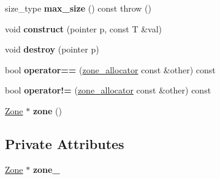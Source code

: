 \begin{DoxyCompactItemize}
\item 
size\+\_\+type {\bfseries max\+\_\+size} () const   throw ()\hypertarget{classv8_1_1internal_1_1zone__allocator_acc053240888a4ee0858b30411dde72d4}{}\label{classv8_1_1internal_1_1zone__allocator_acc053240888a4ee0858b30411dde72d4}

\item 
void {\bfseries construct} (pointer p, const T \&val)\hypertarget{classv8_1_1internal_1_1zone__allocator_a6577687565596d029f37507793c45967}{}\label{classv8_1_1internal_1_1zone__allocator_a6577687565596d029f37507793c45967}

\item 
void {\bfseries destroy} (pointer p)\hypertarget{classv8_1_1internal_1_1zone__allocator_a59a75d1b6c2220221bb73863bf66f56b}{}\label{classv8_1_1internal_1_1zone__allocator_a59a75d1b6c2220221bb73863bf66f56b}

\item 
bool {\bfseries operator==} (\hyperlink{classv8_1_1internal_1_1zone__allocator}{zone\+\_\+allocator} const \&other) const \hypertarget{classv8_1_1internal_1_1zone__allocator_ad47d0343a6939ba85aed7dd97d7326a0}{}\label{classv8_1_1internal_1_1zone__allocator_ad47d0343a6939ba85aed7dd97d7326a0}

\item 
bool {\bfseries operator!=} (\hyperlink{classv8_1_1internal_1_1zone__allocator}{zone\+\_\+allocator} const \&other) const \hypertarget{classv8_1_1internal_1_1zone__allocator_a9547cd20b0acaba1df1d12bef2b77ec5}{}\label{classv8_1_1internal_1_1zone__allocator_a9547cd20b0acaba1df1d12bef2b77ec5}

\item 
\hyperlink{classv8_1_1internal_1_1_zone}{Zone} $\ast$ {\bfseries zone} ()\hypertarget{classv8_1_1internal_1_1zone__allocator_a43a00b3b6f919e207a874ca46bac6a82}{}\label{classv8_1_1internal_1_1zone__allocator_a43a00b3b6f919e207a874ca46bac6a82}

\end{DoxyCompactItemize}
\subsection*{Private Attributes}
\begin{DoxyCompactItemize}
\item 
\hyperlink{classv8_1_1internal_1_1_zone}{Zone} $\ast$ {\bfseries zone\+\_\+}\hypertarget{classv8_1_1internal_1_1zone__allocator_aba540559030e40e1d094871b868c4a38}{}\label{classv8_1_1internal_1_1zone__allocator_aba540559030e40e1d094871b868c4a38}

\end{DoxyCompactItemize}
